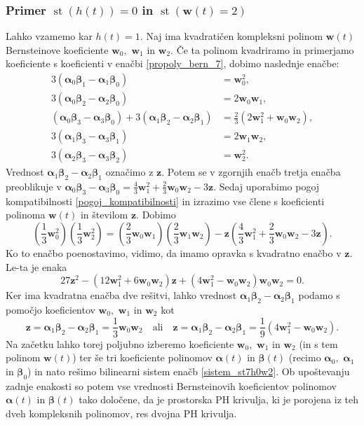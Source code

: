 \documentclass[12pt,a4paper,twoside]{article}
\theoremstyle{definition} %
\theoremstyle{plain} %
\numberwithin{equation}{section}  %
\newcommand{\wV}{\mathbf{w}}
\newcommand{\zV}{\mathbf{z}}
\newcommand{\balpha}{\boldsymbol \alpha}
\newcommand{\bbeta}{\boldsymbol \beta}
\DeclareMathOperator{\st}{st}
\begin{document}
\subsubsection{Primer \texorpdfstring{$\st(h(t))=0$}{st(h(t))=0} in \texorpdfstring{$\st(\wV(t)=2)$}{st(w(t))=2}}
\label{klasifikacija_h0w2}

Lahko vzamemo kar $h(t)=1.$ Naj ima kvadratičen kompleksni polinom $\wV(t)$ Bernsteinove koeficiente $\wV_0,$ $\wV_1$ in $\wV_2.$ Če ta polinom kvadriramo in primerjamo koeficiente s koeficienti v enačbi \eqref{propoly_bern_7}, dobimo naslednje enačbe:
\begin{align}
	3(\balpha_0\bbeta_1-\balpha_1\bbeta_0)&=\wV_0^2,\nonumber\\
	3(\balpha_0\bbeta_2-\balpha_2\bbeta_0)&=2\wV_0\wV_1,\nonumber\\
	(\balpha_0\bbeta_3-\balpha_3\bbeta_0)+3(\balpha_1\bbeta_2-\balpha_2\bbeta_1)&=\frac{2}{3}(2\wV_1^2+\wV_0\wV_2),\nonumber\\
	3(\balpha_1\bbeta_3-\balpha_3\bbeta_1)&=2\wV_1\wV_2,\nonumber\\
	3(\balpha_2\bbeta_3-\balpha_3\bbeta_2)&=\wV_2^2.\label{sistem_st7h0w2}
\end{align}
Vrednost $\balpha_1\bbeta_2-\balpha_2\bbeta_1$ označimo z $\zV.$ Potem se v zgornjih enačb tretja enačba preoblikuje v $\balpha_0\bbeta_3-\balpha_3\bbeta_0=\frac{4}{3}\wV_1^2+\frac{2}{3}\wV_0\wV_2-3\zV.$ Sedaj uporabimo pogoj kompatibilnosti \eqref{pogoj_kompatibilnosti} in izrazimo vse člene s koeficienti polinoma $\wV(t)$ in številom $\zV.$ Dobimo
\begin{equation*}
	\left(\frac{1}{3}\wV_0^2\right)\left(\frac{1}{3}\wV_2^2\right)=\left(\frac{2}{3}\wV_0\wV_1\right)\left(\frac{2}{3}\wV_1\wV_2\right)-\zV\left(\frac{4}{3}\wV_1^2+\frac{2}{3}\wV_0\wV_2-3\zV\right).
\end{equation*}
Ko to enačbo poenostavimo, vidimo, da imamo opravka s kvadratno enačbo v $\zV.$ Le-ta je enaka
\begin{equation*}
	27\zV^2-(12\wV_1^2+6\wV_0\wV_2)\zV+(4\wV_1^2-\wV_0\wV_2)\wV_0\wV_2=0.
\end{equation*}
Ker ima kvadratna enačba dve rešitvi, lahko vrednost $\balpha_1\bbeta_2-\balpha_2\bbeta_1$ podamo s pomočjo koeficientov $\wV_0,$ $\wV_1$ in $\wV_2$ kot
\begin{equation}
	\label{st7h0w2}
	\zV=\balpha_1\bbeta_2-\balpha_2\bbeta_1=\frac{1}{3}\wV_0\wV_2\quad\text{ali}\quad\zV=\balpha_1\bbeta_2-\balpha_2\bbeta_1=\frac{1}{9}(4\wV_1^2-\wV_0\wV_2).
\end{equation}
Na začetku lahko torej poljubno izberemo koeficiente $\wV_0,$ $\wV_1$ in $\wV_2$ (in s tem polinom $\wV(t)$) ter še tri koeficiente polinomov $\balpha(t)$ in $\bbeta(t)$ (recimo $\balpha_0,$ $\balpha_1$ in $\bbeta_0$) in nato rešimo bilinearni sistem enačb \eqref{sistem_st7h0w2}. Ob upoštevanju zadnje enakosti so potem vse vrednosti Bernsteinovih koeficientov polinomov $\balpha(t)$ in $\bbeta(t)$ tako določene, da je prostorska PH krivulja, ki je porojena iz teh dveh kompleksnih polinomov, res dvojna PH krivulja.
\end{document}
